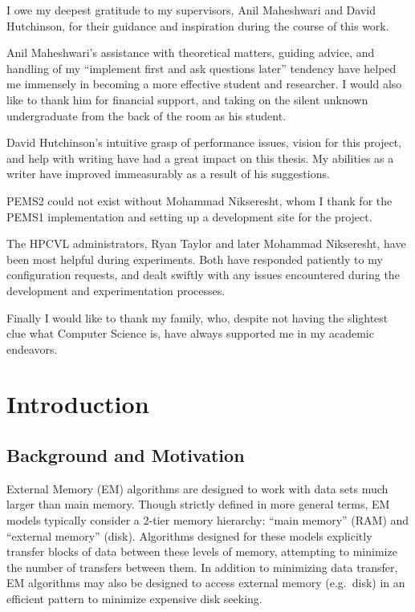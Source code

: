 \documentclass[12pt]{carletoncsthesis}
\begin{document}
\begin{acknowledgements}
I owe my deepest gratitude to my supervisors, Anil Maheshwari and David
Hutchinson, for their guidance and inspiration during the course of this work.

Anil Maheshwari's assistance with theoretical matters, guiding advice, and
handling of my ``implement first and ask questions later'' tendency have
helped me immensely in becoming a more effective student and researcher.
I would also like to thank him for financial support, and taking on the
silent unknown undergraduate from the back of the room as his student.

David Hutchinson's intuitive grasp of performance issues, vision for
this project, and help with writing have had a great impact on this thesis.
My abilities as a writer have improved immeasurably as a result of his
suggestions.

PEMS2 could not exist without Mohammad Nikseresht, whom I thank for the
PEMS1 implementation and setting up a development site for the project.

The HPCVL administrators, Ryan Taylor and later Mohammad Nikseresht, have
been most helpful during experiments.  Both have responded patiently to my
configuration requests, and dealt swiftly with any issues encountered during
the development and experimentation processes.

Finally I would like to thank my family, who, despite not having the
slightest clue what Computer Science is, have always supported me in my
academic endeavors.
\end{acknowledgements}




\frontmatter
\listofalgorithms

\mainmatter


\chapter{Introduction}
\thispagestyle{empty}


\section{Background and Motivation}


External Memory (EM) algorithms are designed to work with data sets much
larger than main memory.  Though strictly defined in more general terms,
EM models typically consider a 2-tier memory hierarchy: ``main memory''
(RAM) and ``external memory'' (disk).  Algorithms designed for these models
explicitly transfer blocks of data between these levels of memory, attempting
to minimize the number of transfers between them.  In addition to minimizing
data transfer, EM algorithms may also be designed to access external memory
(e.g.\ disk) in an efficient pattern to minimize expensive disk seeking.
\end{document}
